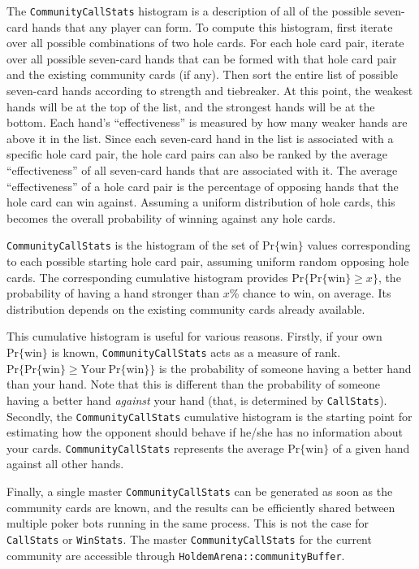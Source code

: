 The \texttt{CommunityCallStats} histogram is a description of all of the possible seven-card hands that any player can form.
To compute this histogram, first iterate over all possible combinations of two hole cards.
For each hole card pair, iterate over all possible seven-card hands that can be formed with that hole card pair and the existing community cards (if any).
Then sort the entire list of possible seven-card hands according to strength and tiebreaker.
At this point, the weakest hands will be at the top of the list, and the strongest hands will be at the bottom.
Each hand's ``effectiveness'' is measured by how many weaker hands are above it in the list.
Since each seven-card hand in the list is associated with a specific hole card pair, the hole card pairs can also be ranked by the average ``effectiveness'' of all seven-card hands that are associated with it.
The average ``effectiveness'' of a hole card pair is the percentage of opposing hands that the hole card can win against.
Assuming a uniform distribution of hole cards, this becomes the overall probability of winning against any hole cards.

\texttt{CommunityCallStats} is the histogram of the set of $\mathrm{Pr\{win\}}$ values corresponding to each possible starting hole card pair, assuming uniform random opposing hole cards.
The corresponding cumulative histogram provides $\mathrm{Pr}\{\mathrm{Pr\{win\}} \ge x\}$, the probability of having a hand stronger than $x$\% chance to win, on average.
Its distribution depends on the existing community cards already available.

This cumulative histogram is useful for various reasons.
Firstly, if your own $\mathrm{Pr\{win\}}$ is known, \texttt{CommunityCallStats} acts as a measure of rank.
$\mathrm{Pr}\{\mathrm{Pr\{win\}} \ge \mathrm{Your\:Pr\{win\}}\}$ is the probability of someone having a better hand than your hand.
Note that this is different than the probability of someone having a better hand \emph{against} your hand (that, is determined by \texttt{CallStats}).
Secondly, the \texttt{CommunityCallStats} cumulative histogram is the starting point for estimating how the opponent should behave if he/she has no information about your cards.
\texttt{CommunityCallStats} represents the average $\mathrm{Pr\{win\}}$ of a given hand against all other hands.

Finally, a single master \texttt{CommunityCallStats} can be generated as soon as the community cards are known, and the results can be efficiently shared between multiple poker bots running in the same process.
This is not the case for \texttt{CallStats} or \texttt{WinStats}.
The master \texttt{CommunityCallStats} for the current community are accessible through \texttt{HoldemArena::communityBuffer}.


